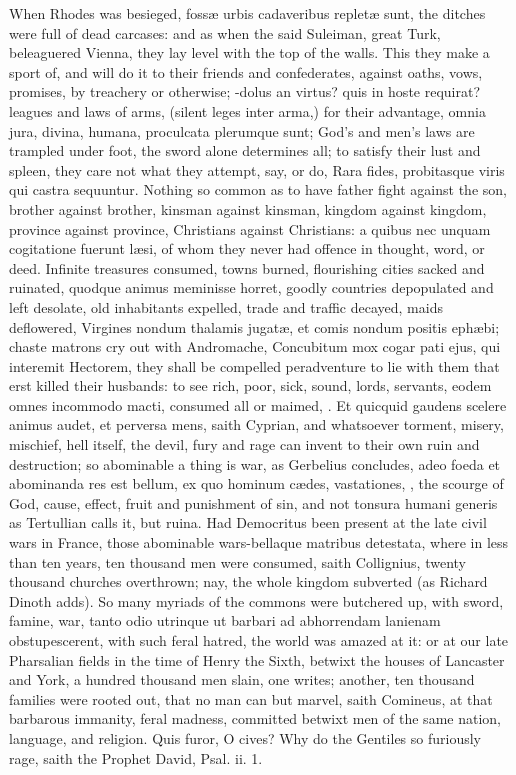 {When Rhodes was besieged, foss\ae{} urbis cadaveribus replet\ae{} sunt,
the ditches were full of dead carcases: and as when the said Suleiman,
great Turk, beleaguered Vienna, they lay level with the top of the
walls. This they make a sport of, and will do it to their friends and
confederates, against oaths, vows, promises, by treachery or otherwise;
-dolus an virtus? quis in hoste requirat? leagues and laws of
arms, (silent leges inter arma,) for their advantage, omnia jura,
divina, humana, proculcata plerumque sunt; God's and men's laws are
trampled under foot, the sword alone determines all; to satisfy their
lust and spleen, they care not what they attempt, say, or do, Rara
fides, probitasque viris qui castra sequuntur. Nothing so common as to
have  father fight against the son, brother against brother,
kinsman against kinsman, kingdom against kingdom, province against
province, Christians against Christians: a quibus nec unquam
cogitatione fuerunt l\ae{}si, of whom they never had offence in thought,
word, or deed. Infinite treasures consumed, towns burned, flourishing
cities sacked and ruinated, quodque animus meminisse horret, goodly
countries depopulated and left desolate, old inhabitants expelled,
trade and traffic decayed, maids deflowered, Virgines nondum thalamis
jugat\ae{}, et comis nondum positis eph\ae{}bi; chaste matrons cry out with
Andromache, Concubitum mox cogar pati ejus, qui interemit
Hectorem, they shall be compelled peradventure to lie with them that
erst killed their husbands: to see rich, poor, sick, sound, lords,
servants, eodem omnes incommodo macti, consumed all or maimed, \etc{}. Et
quicquid gaudens scelere animus audet, et perversa mens, saith Cyprian,
and whatsoever torment, misery, mischief, hell itself, the devil, 
fury and rage can invent to their own ruin and destruction; so
abominable a thing is war, as Gerbelius concludes, adeo foeda et
abominanda res est bellum, ex quo hominum c\ae{}des, vastationes, \etc{}, the
scourge of God, cause, effect, fruit and punishment of sin, and not
tonsura humani generis as Tertullian calls it, but ruina. Had
Democritus been present at the late civil wars in France, those
abominable wars-bellaque matribus detestata, where in less than
ten years, ten thousand men were consumed, saith Collignius, twenty
thousand churches overthrown; nay, the whole kingdom subverted (as
Richard Dinoth adds). So many myriads of the commons were
butchered up, with sword, famine, war, tanto odio utrinque ut barbari
ad abhorrendam lanienam obstupescerent, with such feral hatred, the
world was amazed at it: or at our late Pharsalian fields in the time of
Henry the Sixth, betwixt the houses of Lancaster and York, a hundred
thousand men slain, one writes; another, ten thousand
families were rooted out, that no man can but marvel, saith Comineus,
at that barbarous immanity, feral madness, committed betwixt men of the
same nation, language, and religion. Quis furor, O cives? Why do
the Gentiles so furiously rage, saith the Prophet David, Psal. ii. 1.

}

